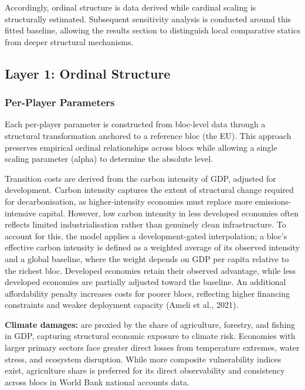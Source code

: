 \documentclass[12pt,a4paper]{article}
\begin{document}
Accordingly, ordinal structure is data derived while cardinal scaling is structurally estimated. Subsequent sensitivity analysis is conducted around this fitted baseline, allowing the results section to distinguish local comparative statics from deeper structural mechanisms.

\subsection{Layer 1: Ordinal Structure}

\subsubsection{Per-Player Parameters}

Each per-player parameter is constructed from bloc-level data through a structural transformation anchored to a reference bloc (the EU). This approach preserves empirical ordinal relationships across blocs while allowing a single scaling parameter (alpha) to determine the absolute level.

Transition costs are derived from the carbon intensity of GDP, adjusted for development. Carbon intensity captures the extent of structural change required for decarbonisation, as higher-intensity economies must replace more emissions-intensive capital. However, low carbon intensity in less developed economies often reflects limited industrialisation rather than genuinely clean infrastructure. To account for this, the model applies a development-gated interpolation; a bloc's effective carbon intensity is defined as a weighted average of its observed intensity and a global baseline, where the weight depends on GDP per capita relative to the richest bloc. Developed economies retain their observed advantage, while less developed economies are partially adjusted toward the baseline. An additional affordability penalty increases costs for poorer blocs, reflecting higher financing constraints and weaker deployment capacity (Ameli et al., 2021).

\textbf{Climate damages:} are proxied by the share of agriculture, forestry, and fishing in GDP, capturing structural economic exposure to climate risk. Economies with larger primary sectors face greater direct losses from temperature extremes, water stress, and ecosystem disruption. While more composite vulnerability indices exist, agriculture share is preferred for its direct observability and consistency across blocs in World Bank national accounts data.
\end{document}
